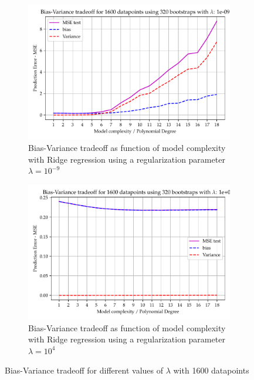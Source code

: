 \documentclass[11pt, a4paper]{article}
\begin{document}
\begin{figure}
  \centering
  \begin{subfigure}{0.49\textwidth}
    \centering
    \includegraphics[width=\textwidth]{figures/EX4_ridge_complexity_using_bootstrap_function_lmb400.pdf}
    \caption{\label{fig:ridge_beta_3}Bias-Variance tradeoff as function of model complexity with Ridge regression using a regularization parameter $\lambda = 10^{-9}$}
  \end{subfigure}
  \hfill
  \begin{subfigure}{0.49\textwidth}
    \centering
    \includegraphics[width=\textwidth]{figures/EX4_ridge_complexity_using_bootstrap_function_lmb4013.pdf}
    \caption{\label{fig:ridge_beta_4}Bias-Variance tradeoff as function of model complexity with Ridge regression using a regularization parameter $\lambda = 10^{4}$}
  \end{subfigure}
  \caption{\label{sfig:ridge_beta_2}Bias-Variance tradeoff for different values of $\lambda$ with 1600 datapoints}
\end{figure}
\end{document}
